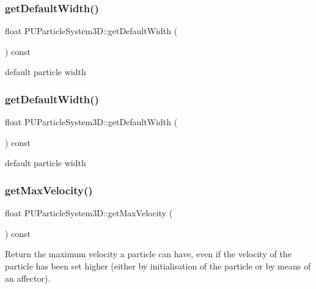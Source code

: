 \subsubsection{\texorpdfstring{get\+Default\+Width()}{getDefaultWidth()}\hspace{0.1cm}{\footnotesize\ttfamily [1/2]}}
{\footnotesize\ttfamily float P\+U\+Particle\+System3\+D\+::get\+Default\+Width (\begin{DoxyParamCaption}{ }\end{DoxyParamCaption}) const}

default particle width \mbox{\label{classPUParticleSystem3D_acf39c57ba2ee73c1dfe332f5dbc5e8ae}} 
\subsubsection{\texorpdfstring{get\+Default\+Width()}{getDefaultWidth()}\hspace{0.1cm}{\footnotesize\ttfamily [2/2]}}
{\footnotesize\ttfamily float P\+U\+Particle\+System3\+D\+::get\+Default\+Width (\begin{DoxyParamCaption}{ }\end{DoxyParamCaption}) const}

default particle width \mbox{\label{classPUParticleSystem3D_a37e80a563fc36e85af5dd32c9ae75eae}} 
\subsubsection{\texorpdfstring{get\+Max\+Velocity()}{getMaxVelocity()}\hspace{0.1cm}{\footnotesize\ttfamily [1/2]}}
{\footnotesize\ttfamily float P\+U\+Particle\+System3\+D\+::get\+Max\+Velocity (\begin{DoxyParamCaption}{ }\end{DoxyParamCaption}) const}

Return the maximum velocity a particle can have, even if the velocity of the particle has been set higher (either by initialisation of the particle or by means of an affector). \mbox{\label{classPUParticleSystem3D_a37e80a563fc36e85af5dd32c9ae75eae}} 
